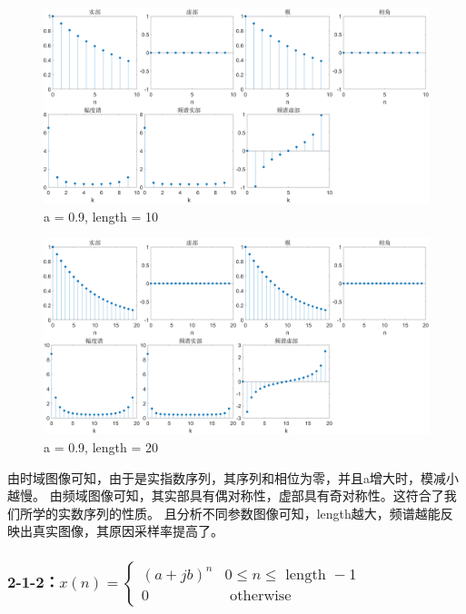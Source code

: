 \documentclass{../source/Experiment}
\begin{document}
            \begin{figure}[H]
                \centering
                \includegraphics[width = \textwidth]{src/2_1_1b}
                \caption{a = 0.9, length = 10}
            \end{figure}

            \begin{figure}[H]
                \centering
                \includegraphics[width = \textwidth]{src/2_1_1c}
                \caption{a = 0.9, length = 20}
            \end{figure}
            
            由时域图像可知，由于是实指数序列，其序列和相位为零，并且a增大时，模减小越慢。
            由频域图像可知，其实部具有偶对称性，虚部具有奇对称性。这符合了我们所学的实数序列的性质。
            且分析不同参数图像可知，length越大，频谱越能反映出真实图像，其原因采样率提高了。

            \subsubsection{2-1-2：$x(n)=\left\{\begin{array}{cl}(a+j b)^{n} & 0 \leq n \leq \text { length }-1 \\ 0 & \text { otherwise }\end{array}\right.$}
\end{document}
